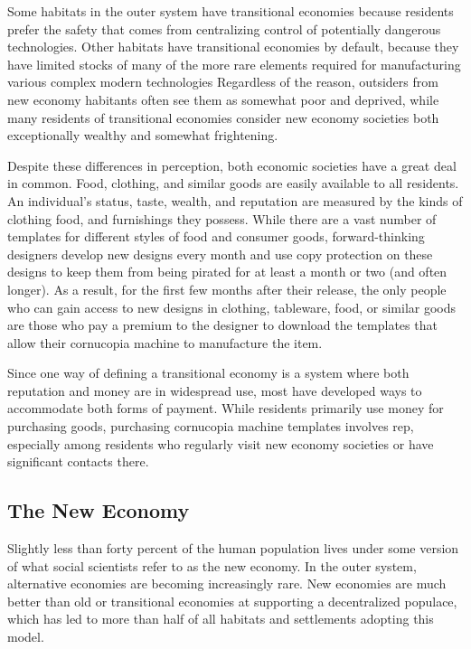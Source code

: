 Some habitats in the outer system have transitional
economies because residents prefer the safety
that comes from centralizing control of potentially 
dangerous technologies. Other habitats have transitional
economies by default, because they have limited
stocks of many of the more rare elements required 
for manufacturing various complex modern technologies
Regardless of the reason, outsiders from new
economy habitants often see them as somewhat poor 
and deprived, while many residents of transitional 
economies consider new economy societies both exceptionally
wealthy and somewhat frightening.

Despite these differences in perception, both economic
societies have a great deal in common. Food,
clothing, and similar goods are easily available to 
all residents. An individual's status, taste, wealth, 
and reputation are measured by the kinds of clothing
food, and furnishings they possess. While there
are a vast number of templates for different styles of 
food and consumer goods, forward-thinking designers
develop new designs every month and use copy
protection on these designs to keep them from being 
pirated for at least a month or two (and often longer). 
As a result, for the first few months after their release, 
the only people who can gain access to new designs in 
clothing, tableware, food, or similar goods are those 
who pay a premium to the designer to download the 
templates that allow their cornucopia machine to 
manufacture the item.

Since one way of defining a transitional economy 
is a system where both reputation and money are 
in widespread use, most have developed ways to accommodate
both forms of payment. While residents
primarily use money for purchasing goods, purchasing
cornucopia machine templates involves rep,
especially among residents who regularly visit new 
economy societies or have significant contacts there.

\subsection{The New Economy}

Slightly less than forty percent of the human population
lives under some version of what social scientists
refer to as the new economy. In the outer system, alternative
economies are becoming increasingly rare. New
economies are much better than old or transitional 
economies at supporting a decentralized populace, 
which has led to more than half of all habitats and 
settlements adopting this model.

